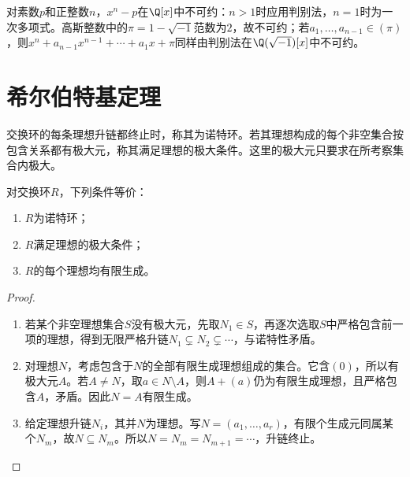 \begin{example}
对素数$p$和正整数$n$，$x^n-p$在$\Q[x]$中不可约：$n>1$时应用判别法，$n=1$时为一次多项式。高斯整数中的$\pi=1-\sqrt{-1}$范数为$2$，故不可约；若$a_1,\ldots,a_{n-1}\in(\pi)$，则$x^n+a_{n-1}x^{n-1}+\cdots+a_1x+\pi$同样由判别法在$\Q(\sqrt{-1})[x]$中不可约。
\end{example}

\section{希尔伯特基定理}

\begin{definition}
交换环的每条理想升链都终止时，称其为诺特环。若其理想构成的每个非空集合按包含关系都有极大元，称其满足理想的极大条件。这里的极大元只要求在所考察集合内极大。
\end{definition}

\begin{theorem}\label{p2:noetherian-equivalences}
对交换环$R$，下列条件等价：
\begin{enumerate}
\item $R$为诺特环；
\item $R$满足理想的极大条件；
\item $R$的每个理想均有限生成。
\end{enumerate}
\end{theorem}
\begin{proof}
\begin{enumerate}
\item[$1)\Rightarrow2)$] 若某个非空理想集合$S$没有极大元，先取$N_1\in S$，再逐次选取$S$中严格包含前一项的理想，得到无限严格升链$N_1\subsetneq N_2\subsetneq\cdots$，与诺特性矛盾。
\item[$2)\Rightarrow3)$] 对理想$N$，考虑包含于$N$的全部有限生成理想组成的集合。它含$(0)$，所以有极大元$A$。若$A\ne N$，取$a\in N\setminus A$，则$A+(a)$仍为有限生成理想，且严格包含$A$，矛盾。因此$N=A$有限生成。
\item[$3)\Rightarrow1)$] 给定理想升链$N_i$，其并$N$为理想。写$N=(a_1,\ldots,a_r)$，有限个生成元同属某个$N_m$，故$N\subseteq N_m$。所以$N=N_m=N_{m+1}=\cdots$，升链终止。
\end{enumerate}
\end{proof}

